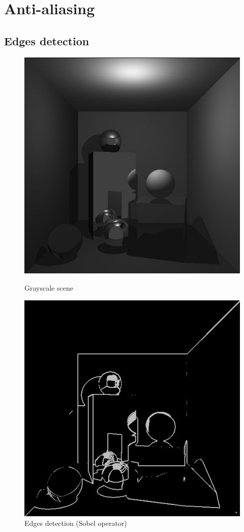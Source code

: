 \section{Anti-aliasing}
\subsection{Edges detection}


\begin{figure}[H]
\centering
{}
    \centering
    \includegraphics[width=\linewidth]{img/antialiasing/grayscale.jpg}
    \caption{Grayscale scene}
\endminipage
{}
    \centering
    \includegraphics[width=\linewidth]{img/antialiasing/sobel.jpg}
    \caption{Edges detection (Sobel operator)}
\endminipage
\end{figure}


